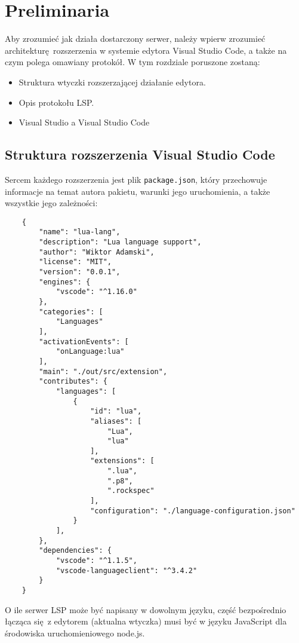\chapter{Preliminaria}
Aby zrozumieć jak działa dostarczony serwer, należy wpierw zrozumieć architekturę rozszerzenia w systemie edytora Visual Studio Code, a także na czym polega omawiany protokół. W tym rozdziale poruszone zostaną:

\begin{itemize}
    \item Struktura wtyczki rozszerzającej działanie edytora.
    \item Opis protokołu LSP.
    \item Visual Studio a Visual Studio Code
\end{itemize}

\section{Struktura rozszerzenia Visual Studio Code}
Sercem każdego rozszerzenia jest plik \texttt{package.json}, który przechowuje informacje na temat autora pakietu, warunki jego uruchomienia, a także wszystkie jego zależności:

\begin{lstlisting}
    {
        "name": "lua-lang",
        "description": "Lua language support",
        "author": "Wiktor Adamski",
        "license": "MIT",
        "version": "0.0.1",
        "engines": {
            "vscode": "^1.16.0"
        },
        "categories": [
            "Languages"
        ],
        "activationEvents": [
            "onLanguage:lua"
        ],
        "main": "./out/src/extension",
        "contributes": {
            "languages": [
                {
                    "id": "lua",
                    "aliases": [
                        "Lua",
                        "lua"
                    ],
                    "extensions": [
                        ".lua",
                        ".p8",
                        ".rockspec"
                    ],
                    "configuration": "./language-configuration.json"
                }
            ],
        },
        "dependencies": {
            "vscode": "^1.1.5",
            "vscode-languageclient": "^3.4.2"
        }
    }
\end{lstlisting}

O ile serwer LSP może być napisany w dowolnym języku, część bezpośrednio łącząca się z edytorem (aktualna wtyczka) musi być w języku JavaScript dla środowiska uruchomieniowego node.js. 

